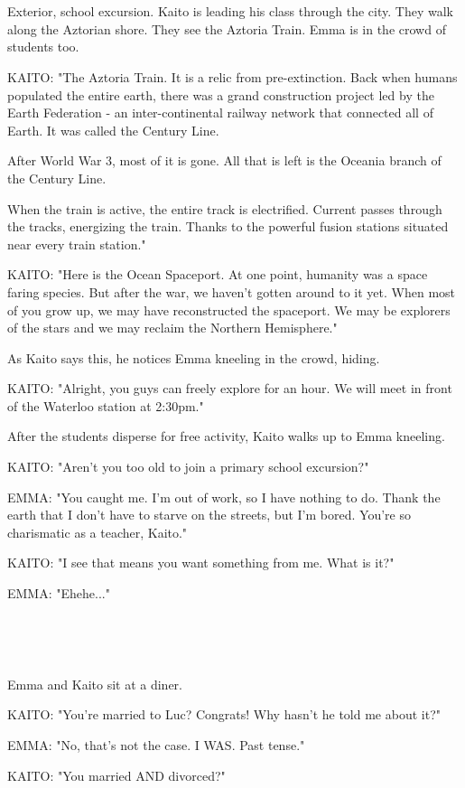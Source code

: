 \documentclass[11pt]{article}
\begin{document}
\ 

\ 

Exterior, school excursion.
Kaito is leading his class through the city.
They walk along the Aztorian shore. 
They see the Aztoria Train.
Emma is in the crowd of students too.

KAITO: "The Aztoria Train. 
It is a relic from pre-extinction.
Back when humans populated the entire earth, there was a grand construction project led by the Earth Federation - an inter-continental railway network that connected all of Earth.
It was called the Century Line.

After World War 3, most of it is gone.
All that is left is the Oceania branch of the Century Line.

When the train is active, the entire track is electrified.
Current passes through the tracks, energizing the train.
Thanks to the powerful fusion stations situated near every train station."

KAITO: "Here is the Ocean Spaceport.
At one point, humanity was a space faring species. 
But after the war, we haven't gotten around to it yet.
When most of you grow up, we may have reconstructed the spaceport. 
We may be explorers of the stars and we may reclaim the Northern Hemisphere."

As Kaito says this, he notices Emma kneeling in the crowd, hiding.

KAITO: "Alright, you guys can freely explore for an hour.
We will meet in front of the Waterloo station at 2:30pm."

After the students disperse for free activity, Kaito walks up to Emma kneeling.

KAITO: "Aren't you too old to join a primary school excursion?"

EMMA: "You caught me. 
I'm out of work, so I have nothing to do. 
Thank the earth that I don't have to starve on the streets, but I'm bored.
You're so charismatic as a teacher, Kaito."

KAITO: "I see that means you want something from me. 
What is it?"

EMMA: "Ehehe..."

\ 

\ 

Emma and Kaito sit at a diner.

KAITO: "You're married to Luc? Congrats! Why hasn't he told me about it?"

EMMA: "No, that's not the case. 
I WAS. Past tense."

KAITO: "You married AND divorced?"
\end{document}
